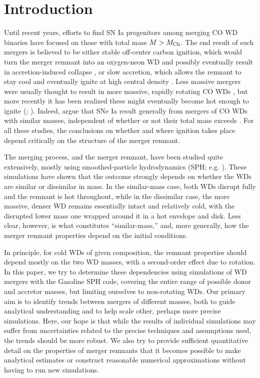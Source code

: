 \section{Introduction}
\label{sec:c2_intro}

Until recent years, efforts to find SN Ia progenitors among merging CO WD binaries have focused on those with total mass $M>\Mch$.  The end result of such mergers is believed to be either stable off-center carbon ignition, which would turn the merger remnant into an oxygen-neon WD and possibly eventually result in accretion-induced collapse \citep{saion98}, or slow accretion, which allows the remnant to stay cool and eventually ignite at high central density \citep{yoonpr07}.  Less massive mergers were usually thought to result in more massive, rapidly rotating CO WDs \citep{segrcm97,kube+10}, but more recently it has been realized these might eventually become hot enough to ignite (\citeal{vkercj10}; \citealt{shen+12,schw+12}).  Indeed, \citeal{vkercj10} argue that SNe Ia result generally from mergers of CO WDs with similar masses, independent of whether or not their total mass exceeds \Mch.  For all these studies, the conclusions on whether and where ignition takes place depend critically on the structure of the merger remnant.

The merging process, and the merger remnant, have been studied quite extensively, mostly using smoothed-particle hydrodynamics (SPH; e.g. \citealt{mona05}).  These simulations have shown that the outcome strongly depends on whether the WDs are similar or dissimilar in mass.  In the similar-mass case, both WDs disrupt fully and the remnant is hot throughout, while in the dissimilar case, the more massive, denser WD remains essentially intact and relatively cold, with the disrupted lower mass one wrapped around it in a hot envelope and disk.  Less clear, however, is what constitutes ``similar-mass,'' and, more generally, how the merger remnant properties depend on the initial conditions.  

In principle, for cold WDs of given composition, the remnant properties should depend mostly on the two WD masses, with a second-order effect due to rotation.  In this paper, we try to determine these dependencies using simulations of WD mergers with the Gasoline SPH code, covering the entire range of possible donor and accretor masses, but limiting ourselves to non-rotating WDs.  Our primary aim is to identify trends between mergers of different masses, both to guide analytical understanding and to help scale other, perhaps more precise simulations.  Here, our hope is that while the results of individual simulations may suffer from uncertainties related to the precise techniques and assumptions used, the trends should be more robust.  We also try to provide sufficient quantitative detail on the properties of merger remnants that it becomes possible to make analytical estimates or construct reasonable numerical approximations without having to run new simulations.

